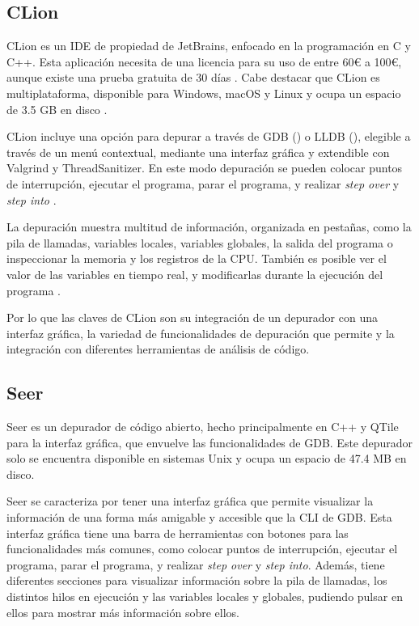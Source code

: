 \subsection{CLion}{\label{subsec:clion}}
CLion es un \gls{IDE} de propiedad de JetBrains, enfocado en la programación en C y C++. Esta aplicación necesita de una licencia para su uso de entre 60€ a 100€, aunque existe una prueba gratuita de 30 días \cite{ClionPrizing}. Cabe destacar que CLion es multiplataforma, disponible para Windows, macOS y Linux y ocupa un espacio de 3.5 GB en disco \cite{ClionDownload}.

CLion incluye una opción para depurar a través de GDB () o LLDB (), elegible a través de un menú contextual, mediante una \gls{interfaz gráfica} y extendible con Valgrind y ThreadSanitizer. En este modo depuración se pueden colocar puntos de interrupción, ejecutar el programa, parar el programa, y realizar \textit{\gls{step over}} y \textit{\gls{step into}} \cite{ClionDebugger}.

La depuración muestra multitud de información, organizada en pestañas, como la pila de llamadas, variables locales, variables globales, la salida del programa o inspeccionar la memoria y los \gls{registros} de la \gls{CPU}. También es posible ver el valor de las variables en tiempo real, y modificarlas durante la ejecución del programa \cite{ClionDebuggerToolWindow}.

Por lo que las claves de CLion son su integración de un \gls{depurador} con una \gls{interfaz gráfica}, la variedad de funcionalidades de depuración que permite y la integración con diferentes herramientas de análisis de código.

\subsection{Seer}{\label{subsec:seer}}
Seer es un depurador de código abierto, hecho principalmente en C++ y QTile para la \gls{interfaz gráfica}, que envuelve las funcionalidades de GDB. Este \gls{depurador} solo se encuentra disponible en sistemas Unix y ocupa un espacio de 47.4 MB en disco. 

Seer se caracteriza por tener una \gls{interfaz gráfica} que permite visualizar la información de una forma más amigable y accesible que la \gls{CLI} de GDB. Esta interfaz gráfica tiene una barra de herramientas con botones para las funcionalidades más comunes, como colocar puntos de interrupción, ejecutar el programa, parar el programa, y realizar \textit{\gls{step over}} y \textit{\gls{step into}}. Además, tiene diferentes secciones para visualizar información sobre la pila de llamadas, los distintos \glspl{hilo} en ejecución y las variables locales y globales, pudiendo pulsar en ellos para mostrar más información sobre ellos.

